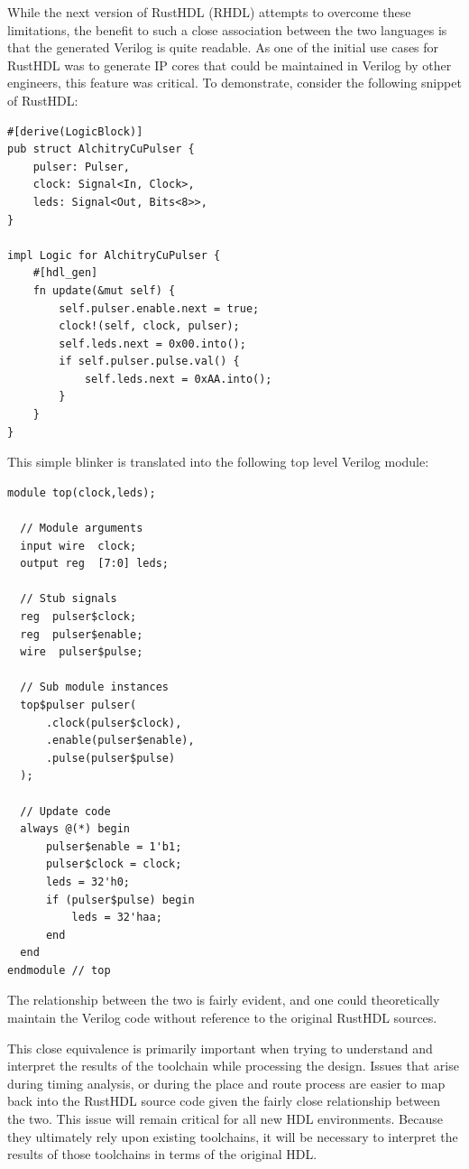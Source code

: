 \documentclass[conference]{IEEEtran}
\begin{document}
While the next version of RustHDL (RHDL) attempts to overcome these limitations, the benefit to such a close 
association between the two languages is that the generated Verilog is quite readable.  As one of the initial 
use cases for RustHDL was to generate IP cores that could be maintained in Verilog by other engineers, this feature
was critical.  To demonstrate, consider the following snippet of RustHDL:

\begin{verbatim}
#[derive(LogicBlock)]
pub struct AlchitryCuPulser {
    pulser: Pulser,
    clock: Signal<In, Clock>,
    leds: Signal<Out, Bits<8>>,
}

impl Logic for AlchitryCuPulser {
    #[hdl_gen]
    fn update(&mut self) {
        self.pulser.enable.next = true;
        clock!(self, clock, pulser);
        self.leds.next = 0x00.into();
        if self.pulser.pulse.val() {
            self.leds.next = 0xAA.into();
        }
    }
}
\end{verbatim}

This simple blinker is translated into the following top level Verilog module:

\begin{verbatim}
module top(clock,leds);
  
  // Module arguments
  input wire  clock;
  output reg  [7:0] leds;
  
  // Stub signals
  reg  pulser$clock;
  reg  pulser$enable;
  wire  pulser$pulse;
  
  // Sub module instances
  top$pulser pulser(
      .clock(pulser$clock),
      .enable(pulser$enable),
      .pulse(pulser$pulse)
  );
  
  // Update code
  always @(*) begin
      pulser$enable = 1'b1;
      pulser$clock = clock;
      leds = 32'h0;
      if (pulser$pulse) begin
          leds = 32'haa;
      end
  end  
endmodule // top
\end{verbatim}

The relationship between the two is fairly evident, and one could theoretically maintain the Verilog
code without reference to the original RustHDL sources.

This close equivalence is primarily important when trying to understand and interpret 
the results of the toolchain while processing the design.  Issues that arise during timing analysis, or
during the place and route process are easier to map back into the RustHDL source code given the fairly 
close relationship between the two.  This issue will remain critical for all new HDL environments.  Because 
they ultimately rely upon existing toolchains, it will be necessary to interpret the results of those toolchains
in terms of the original HDL.
\end{document}
